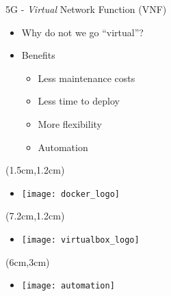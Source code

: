 \begin{frame}{5G - \textit{Virtual} Network Function (VNF)}
  \begin{itemize}
    \item[]<1-> Why do not we go ``virtual''?
  \end{itemize}

  \begin{itemize}
  \item[]<2-> Benefits
    \begin{itemize}
    \item<3-> Less maintenance costs
    \item<4-> Less time to deploy
    \item<5-> More flexibility
    \item<6-> Automation
    \end{itemize}
  \end{itemize}



  \begin{textblock*}{5cm}(1.5cm,1.2cm)
    \begin{itemize}
    \item[]<2-> \texttt{[image: docker\_logo]}
    \end{itemize}
  \end{textblock*}

  \begin{textblock*}{5cm}(7.2cm,1.2cm)
    \begin{itemize}
    \item[]<3-> \texttt{[image: virtualbox\_logo]}
    \end{itemize}
  \end{textblock*}

  \begin{textblock*}{5cm}(6cm,3cm)
    \begin{itemize}
    \item[]<6-> \texttt{[image: automation]}
    \end{itemize}
  \end{textblock*}
\end{frame}
